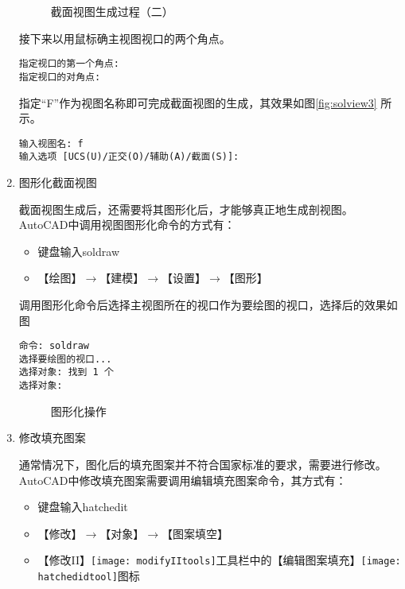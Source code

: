 \begin{procedure}
\begin{enumerate}
\begin{figure}[htbp]
\centering
{}\hspace{20pt}
\caption{截面视图生成过程（二）}
\end{figure}

接下来以用鼠标确主视图视口的两个角点。
\begin{lstlisting}
指定视口的第一个角点:
指定视口的对角点:
\end{lstlisting}

指定“F”作为视图名称即可完成截面视图的生成，其效果如图\ref{fig:solview3} 所示。
\begin{lstlisting}
输入视图名: f
输入选项 [UCS(U)/正交(O)/辅助(A)/截面(S)]:
\end{lstlisting}

\item 图形化截面视图

截面视图生成后，还需要将其图形化后，才能够真正地生成剖视图。AutoCAD中调用视图图形化命令的方式有：
\begin{itemize}
\item 键盘输入soldraw
\item 【绘图】$\rightarrow $【建模】$\rightarrow $【设置】$\rightarrow $【图形】
\end{itemize}

调用图形化命令后选择主视图所在的视口作为要绘图的视口，选择后的效果如图
\begin{lstlisting}
命令: soldraw
选择要绘图的视口...
选择对象: 找到 1 个
选择对象:
\end{lstlisting}

\begin{figure}[htbp]
\centering
{}\hspace{20pt}
\caption{图形化操作}
\end{figure}

\item 修改填充图案

通常情况下，图化后的填充图案并不符合国家标准的要求，需要进行修改。AutoCAD中修改填充图案需要调用编辑填充图案命令，其方式有：
\begin{itemize}
\item 键盘输入hatchedit
\item 【修改】$\rightarrow $【对象】$\rightarrow $【图案填空】
\item 【修改II】\texttt{[image: modifyIItools]}工具栏中的【编辑图案填充】\texttt{[image: hatchedidtool]}图标
\end{itemize}


\end{enumerate}
\end{procedure}
